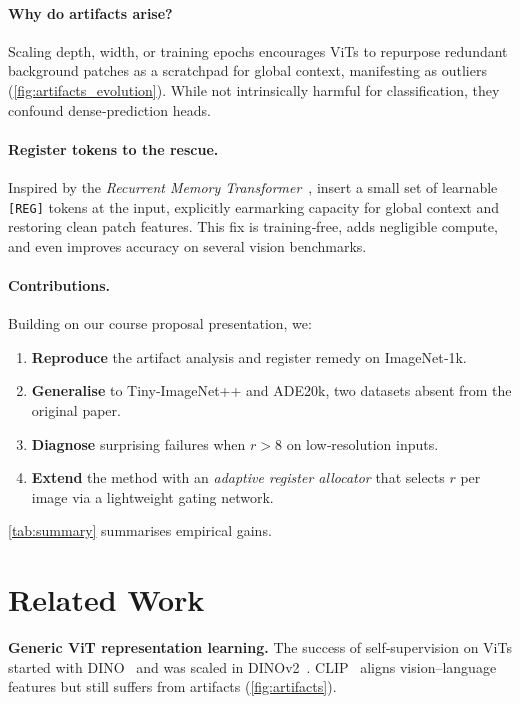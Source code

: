 \documentclass{article}
\newcommand{\RegTok}{\texttt{[REG]}\xspace}
\newcommand{\nreg}{r}
\newcommand{\citet}{\textcite}
\begin{document}
\paragraph{Why do artifacts arise?}  Scaling depth, width, or training epochs encourages ViTs to repurpose redundant background patches as a scratchpad for global context, manifesting as outliers (\cref{fig:artifacts_evolution}).  While not intrinsically harmful for classification, they confound dense‑prediction heads.

\paragraph{Register tokens to the rescue.}  Inspired by the \emph{Recurrent Memory Transformer}~\cite{bulatovRecurrentMemoryTransformer2022}, \citet{darcetVisionTransformersNeed2024} insert a small set of learnable \RegTok tokens at the input, explicitly earmarking capacity for global context and restoring clean patch features.  This fix is training‑free, adds negligible compute, and even improves accuracy on several vision benchmarks.

\paragraph{Contributions.}  Building on our course proposal presentation, we:
\begin{enumerate}
\item \textbf{Reproduce} the artifact analysis and register remedy on ImageNet‑1k.
\item \textbf{Generalise} to Tiny‑ImageNet++ and ADE20k, two datasets absent from the original paper.
\item \textbf{Diagnose} surprising failures when $\nreg>8$ on low‑resolution inputs.
\item \textbf{Extend} the method with an \emph{adaptive register allocator} that selects $\nreg$ per image via a lightweight gating network.
\end{enumerate}

\cref{tab:summary} summarises empirical gains.

\section{Related Work}
\label{sec:related}
\textbf{Generic ViT representation learning.}  The success of self‑supervision on ViTs started with DINO~\cite{caronEmergingPropertiesSelfsupervised2021} and was scaled in DINOv2~\cite{oquabDINOv2LearningRobust2024}.  CLIP~\cite{ilharco_gabriel_2021_5143773} aligns vision–language features but still suffers from artifacts (\cref{fig:artifacts}).
\end{document}

